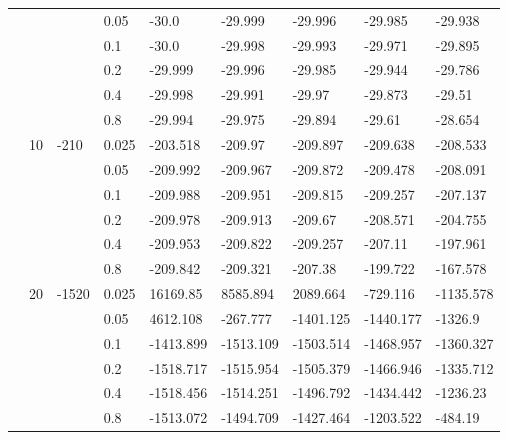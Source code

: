 \begin{longtable}{|l|l|l|l|l|l|l|l|l|}
\cmidrule{4-9} &     &          & 0.05           & -30.0      & -29.999    & -29.996    & -29.985    & -29.938    \\
\cmidrule{4-9} &     &          & 0.1            & -30.0      & -29.998    & -29.993    & -29.971    & -29.895    \\
\cmidrule{4-9} &     &          & 0.2            & -29.999    & -29.996    & -29.985    & -29.944    & -29.786    \\
\cmidrule{4-9} &     &          & 0.4            & -29.998    & -29.991    & -29.97     & -29.873    & -29.51     \\
\cmidrule{4-9} &     &          & 0.8            & -29.994    & -29.975    & -29.894    & -29.61     & -28.654    \\
\cmidrule{2-9} & 10  & -210     & 0.025          & -203.518   & -209.97    & -209.897   & -209.638   & -208.533   \\
\cmidrule{4-9} &     &          & 0.05           & -209.992   & -209.967   & -209.872   & -209.478   & -208.091   \\
\cmidrule{4-9} &     &          & 0.1            & -209.988   & -209.951   & -209.815   & -209.257   & -207.137   \\
\cmidrule{4-9} &     &          & 0.2            & -209.978   & -209.913   & -209.67    & -208.571   & -204.755   \\
\cmidrule{4-9} &     &          & 0.4            & -209.953   & -209.822   & -209.257   & -207.11    & -197.961   \\
\cmidrule{4-9} &     &          & 0.8            & -209.842   & -209.321   & -207.38    & -199.722   & -167.578   \\
\cmidrule{2-9} & 20  & -1520    & 0.025          & 16169.85   & 8585.894   & 2089.664   & -729.116   & -1135.578  \\
\cmidrule{4-9} &     &          & 0.05           & 4612.108   & -267.777   & -1401.125  & -1440.177  & -1326.9    \\
\cmidrule{4-9} &     &          & 0.1            & -1413.899  & -1513.109  & -1503.514  & -1468.957  & -1360.327  \\
\cmidrule{4-9} &     &          & 0.2            & -1518.717  & -1515.954  & -1505.379  & -1466.946  & -1335.712  \\
\cmidrule{4-9} &     &          & 0.4            & -1518.456  & -1514.251  & -1496.792  & -1434.442  & -1236.23   \\
\cmidrule{4-9} &     &          & 0.8            & -1513.072  & -1494.709  & -1427.464  & -1203.522  & -484.19    \\

\end{longtable}
